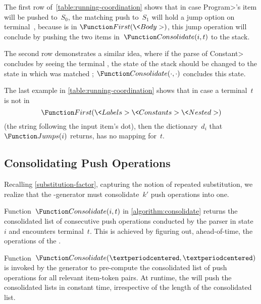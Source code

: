 The first row of~\cref{table:running-coordination} shows that in case
\<Program>'s item will be pushed to~$S_0$, the matching push to~$S_1$ will hold
a jump option on terminal~, because  is in $\Function
First(\<Body>)$, this jump operation will conclude by pushing the two items
in~$\Function Consolidate(i,t)$ to the stack.

The second row demonstrates a similar idea, where if the parse of \<Constant>
concludes by seeing the terminal \cc{;}, the state of the stack should be
changed to the state in which \cc{;} was matched ; $\Function
Consolidate(\cdot,\cdot)$ concludes this state.

The last example in \cref{table:running-coordination} shows that in case a
terminal~$t$ is not in \[ \Function First(\<Labels> \<Constants> \<Nested>)\]
(the string following the input item's dot), then the dictionary~$d_i$
that~$\Function Jumps(i)$ returns, has no mapping for~$t$.

\subsection{Consolidating Push Operations}
\label{subsection:consolidate}
Recalling \cref{substitution-factor}, capturing the notion of
repeated substitution, we realize that the \RLLp-generator
must consolidate~$k'$ push operations into one.

Function~$\Function Consolidate(i,t)$ in \cref{algorithm:consolidate}
returns the consolidated list of consecutive push operations conducted
by the \RLLp parser in state~$i$ and encounters terminal~$t$.
This is achieved by figuring out, ahead-of-time,
the operations of the \LLp.

Function~$\Function Consolidate(·,·)$ is invoked by the \RLLp generator to
pre-compute the consolidated list of push operations for all relevant
item-token pairs. At runtime, the \RLLp will push the consolidated lists in
constant time, irrespective of the length of the consolidated list.

